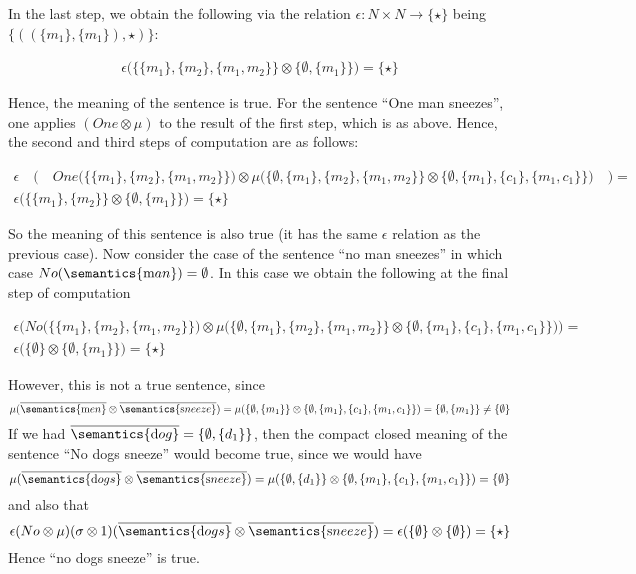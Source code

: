 \noindent
In the last step, we obtain the following via the  relation $\epsilon \colon N \times N \to \{\star\}$ being $\{((\{m_1\}, \{m_1\}), \star)\}$:

\begin{align*}
\epsilon\Big(\{\{m_1\}, \{m_2\}, \{m_1, m_2\}\}  \otimes \{\emptyset, \{m_1\}\}\Big) = \{\star\}
\end{align*}

\noindent
Hence, the meaning of the sentence is true.  For the sentence ``One man sneezes'',  one applies $(One \otimes \mu)$ to the result of the first step, which is as above. Hence,  the second and third steps of computation are as follows:

\begin{align*}
\epsilon \quad  \Big( \quad One\Big ( \{\{m_1\}, \{m_2\}, \{m_1, m_2\}\} \Big) \otimes \mu \Big( \{\emptyset, \{m_1\}, \{m_2\}, \{m_1, m_2\}\}  \otimes \{\emptyset, \{m_1\}, \{c_1\}, \{m_1, c_1\}\} \Big) \quad \Big) =&\\
\epsilon \Big(\{\{m_1\}, \{m_2\}\}  \otimes \{\emptyset, \{m_1\}\}\Big) = \{\star\}
\end{align*}

\noindent
So the meaning of this sentence is also true (it has the same $\epsilon$ relation as the previous case). Now consider the case of the  sentence ``no man sneezes'' in which case $No (\semantics{\text man}) = \emptyset$. In this case we obtain  the following at the final step of computation

\begin{align*}
\epsilon\Big( No\Big ( \{\{m_1\}, \{m_2\}, \{m_1, m_2\}\} \Big) \otimes \mu \Big( \{\emptyset, \{m_1\}, \{m_2\}, \{m_1, m_2\}\}  \otimes \{\emptyset, \{m_1\}, \{c_1\}, \{m_1, c_1\}\} \Big)\Big) =&\\
\epsilon \Big(\{\emptyset\}  \otimes \{\emptyset, \{m_1\}\}\Big) = \{\star\}
\end{align*}

\noindent
However, this is not a true sentence, since  
\[
\mu(\overline{\semantics{\text men}} \otimes \overline{\semantics{\text sneeze}}) = \mu(\{\emptyset, \{m_1\}\} \otimes \{\emptyset, \{m_1\}, \{c_1\}, \{m_1, c_1\}\}) = \{\emptyset, \{m_1\}\}   \neq \{\emptyset\}
\]
 If we had $\overline{\semantics{\text dog}} = \{\emptyset, \{d_1\}\}$, then the compact closed meaning of the sentence ``No dogs sneeze''  would become true, since we would have
\[
\mu(\overline{\semantics{\text dogs}} \otimes \overline{\semantics{\text sneeze}}) = \mu(\{\emptyset, \{d_1\}\} \otimes \{\emptyset, \{m_1\}, \{c_1\}, \{m_1, c_1\}\}) = \{\emptyset\}
\]
and also that  
\[
\epsilon(No \otimes \mu)(\sigma \otimes 1) (\overline{\semantics{\text dogs}} \otimes \overline{\semantics{\text sneeze}})=  \epsilon(\{\emptyset\}  \otimes \{\emptyset\}) = \{\star\}
\]
Hence ``no dogs sneeze'' is true. 


